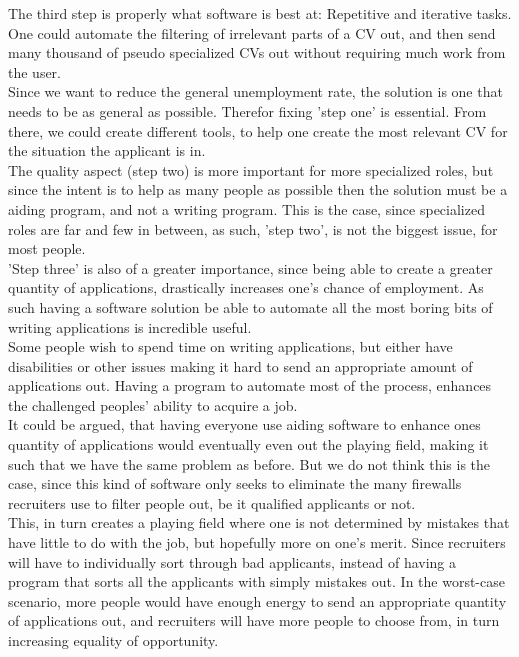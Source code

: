 The third step is properly what software is best at: Repetitive and iterative
tasks.
One could automate the filtering of irrelevant parts of a CV out, and then send
many thousand of pseudo specialized CVs out without requiring much work from the
user. \\

Since we want to reduce the general unemployment rate, the solution is one that needs to 
be as general as possible. Therefor fixing 'step one' is essential.
From there, we could create different tools, to help one create the most relevant
CV for the situation the applicant is in. \\

The quality aspect (step two) is more important for more specialized roles, 
but since the intent is to help as many people as possible then the solution
must be a aiding program, and not a writing program.
This is the case, since specialized roles are far and few in between,
as such, 'step two', is not the biggest issue, for most people. \\

'Step three' is also of a greater importance, since being able to create a
greater quantity of applications, drastically increases one's chance of
employment. 
As such having a software solution be able to automate all the most boring
bits of writing applications is incredible useful. \\

Some people wish to spend time on writing applications, but either have
disabilities or other issues making it hard to send an appropriate amount
of applications out. Having a program to automate most of the process, enhances
the challenged peoples' ability to acquire a job. \\

It could be argued, that having everyone use aiding software to enhance ones
quantity of applications would eventually even out the playing field, making
it such that we have the same problem as before. 
But we do not think this is the case, since this kind of software only seeks
to eliminate the many firewalls recruiters use to filter people out, be it 
qualified applicants or not. \\

This, in turn creates a playing field  where one is not determined by
mistakes that have little to do with the job, but hopefully more on one's merit. 
Since recruiters will have to individually sort through bad applicants, instead of having 
a program that sorts all the applicants with simply mistakes out. In the worst-case scenario, more
people would have enough energy to send an appropriate quantity of applications
out, and recruiters will have more people to choose from, in turn increasing
equality of opportunity.

